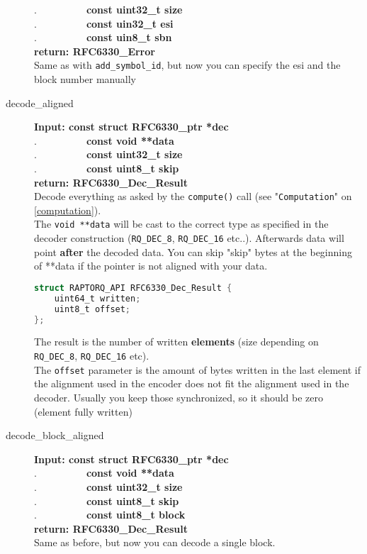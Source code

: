 \documentclass[11pt,a4paper]{refart}
\begin{document}
\begin{description}
.\ \ \ \ \ \ \ \ \ \ \textbf{const uint32\_t size}\\
.\ \ \ \ \ \ \ \ \ \ \textbf{const uin32\_t esi}\\
.\ \ \ \ \ \ \ \ \ \ \textbf{const uin8\_t sbn}\\
\textbf{return: RFC6330\_Error}\\
Same as with \texttt{add\_symbol\_id}, but now you can specify the esi and the block number manually
\item[decode\_aligned]\textbf{Input: const struct RFC6330\_ptr *dec}\\
.\ \ \ \ \ \ \ \ \ \ \textbf{const void **data}\\
.\ \ \ \ \ \ \ \ \ \ \textbf{const uint32\_t size}\\
.\ \ \ \ \ \ \ \ \ \ \textbf{const uint8\_t skip}\\
\textbf{return: RFC6330\_Dec\_Result}\\
Decode everything as asked by the \texttt{compute()} call (see "\texttt{Computation}" on \ref{computation}).\\
The \texttt{void **data} will be cast to the correct type as specified in the decoder construction (\texttt{RQ\_DEC\_8}, \texttt{RQ\_DEC\_16} etc..). Afterwards data will point \textbf{after} the decoded data. You can skip "skip" bytes at the beginning of **data if the pointer
is not aligned with your data.
\begin{lstlisting}[language=C]
struct RAPTORQ_API RFC6330_Dec_Result {
	uint64_t written;
	uint8_t offset;
};
\end{lstlisting}
The result is the number of written \textbf{elements} (size depending on \texttt{RQ\_DEC\_8}, \texttt{RQ\_DEC\_16} etc).\\
The \texttt{offset} parameter is the amount of bytes written in the last element if the alignment used in the encoder does not fit the
alignment used in the decoder. Usually you keep those synchronized, so it should be zero (element fully written)
\newpage
\item[decode\_block\_aligned]\textbf{Input: const struct RFC6330\_ptr *dec}\\
.\ \ \ \ \ \ \ \ \ \ \textbf{const void **data}\\
.\ \ \ \ \ \ \ \ \ \ \textbf{const uint32\_t size}\\
.\ \ \ \ \ \ \ \ \ \ \textbf{const uint8\_t skip}\\
.\ \ \ \ \ \ \ \ \ \ \textbf{const uint8\_t block}\\
\textbf{return: RFC6330\_Dec\_Result}\\
Same as before, but now you can decode a single block.


\end{description}
\end{document}
